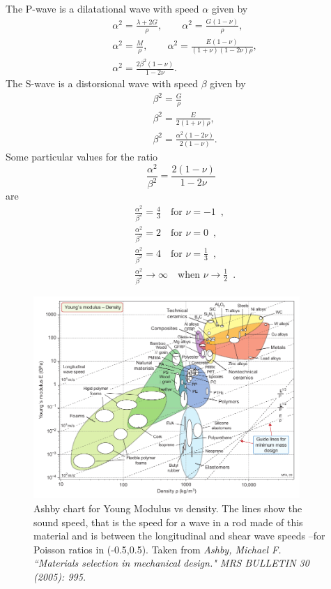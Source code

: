 \documentclass[12pt,letterpaper]{article}
\begin{document}
The P-wave is a dilatational wave with speed $\alpha$ given by 
\begin{align*}
 & \alpha^{2}=\frac{\lambda+2G}{\rho},\qquad\alpha^{2}=\frac{G(1-\nu)}{\rho},\\
 & \alpha^{2}=\frac{M}{\rho},\qquad\alpha^{2}=\frac{E(1-\nu)}{(1+\nu)(1-2\nu)\rho},\\
 & \alpha^{2}=\frac{2\beta^{2}(1-\nu)}{1-2\nu}.
\end{align*}
 The S-wave is a distorsional wave with speed $\beta$ given by 
\begin{align*}
 & \beta^{2}=\frac{G}{\rho}\\
 & \beta^{2}=\frac{E}{2(1+\nu)\rho},\\
 & \beta^{2}=\frac{\alpha^{2}(1-2\nu)}{2(1-\nu)}.
\end{align*}
 Some particular values for the ratio 
\[
\frac{\alpha^{2}}{\beta^{2}}=\frac{2(1-\nu)}{1-2\nu}
\]
 are 
\begin{align*}
 & \frac{\alpha^{2}}{\beta^{2}}=\frac{4}{3}\quad\mbox{for }\nu=-1\enspace,\\
 & \frac{\alpha^{2}}{\beta^{2}}=2\quad\mbox{for }\nu=0\enspace,\\
 & \frac{\alpha^{2}}{\beta^{2}}=4\quad\mbox{for }\nu=\frac{1}{3}\enspace,\\
 & \frac{\alpha^{2}}{\beta^{2}}\rightarrow\infty\quad\mbox{when }\nu\rightarrow\frac{1}{2}\enspace.
\end{align*}

\begin{figure}[h]
\centering
\includegraphics[width=0.9\textwidth]{img/E_vs_density-vector.pdf} 
\caption{Ashby chart for Young Modulus vs density. The lines show the sound speed, that is the speed for a wave in a rod made of this material and is between the longitudinal and shear wave speeds --for Poisson ratios in (-0.5,0.5). Taken from \emph{Ashby, Michael F. ``Materials selection in mechanical design." MRS BULLETIN 30 (2005): 995.}}
\end{figure}
\end{document}
